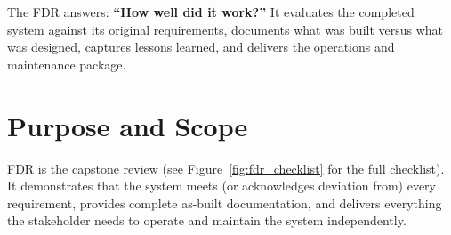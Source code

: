 \documentclass[11pt,letterpaper,twoside,openany]{book}
\begin{document}
\vspace{1em}

The FDR answers: \textbf{``How well did it work?''} It evaluates the completed system against its original requirements, documents what was built versus what was designed, captures lessons learned, and delivers the operations and maintenance package.

\vspace{1em}

\section{Purpose and Scope}
FDR is the capstone review (see Figure~\ref{fig:fdr_checklist} for the full checklist). It demonstrates that the system meets (or acknowledges deviation from) every requirement, provides complete as-built documentation, and delivers everything the stakeholder needs to operate and maintain the system independently.
\end{document}
